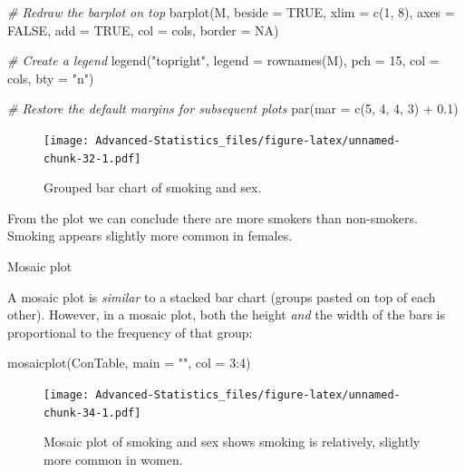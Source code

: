 \documentclass[
]{book}
\newenvironment{Shaded}{\begin{snugshade}}{\end{snugshade}}
\newcommand{\AttributeTok}[1]{\textcolor[rgb]{0.77,0.63,0.00}{#1}}
\newcommand{\CommentTok}[1]{\textcolor[rgb]{0.56,0.35,0.01}{\textit{#1}}}
\newcommand{\ConstantTok}[1]{\textcolor[rgb]{0.00,0.00,0.00}{#1}}
\newcommand{\DecValTok}[1]{\textcolor[rgb]{0.00,0.00,0.81}{#1}}
\newcommand{\FloatTok}[1]{\textcolor[rgb]{0.00,0.00,0.81}{#1}}
\newcommand{\FunctionTok}[1]{\textcolor[rgb]{0.00,0.00,0.00}{#1}}
\newcommand{\NormalTok}[1]{#1}
\newcommand{\SpecialCharTok}[1]{\textcolor[rgb]{0.00,0.00,0.00}{#1}}
\newcommand{\StringTok}[1]{\textcolor[rgb]{0.31,0.60,0.02}{#1}}
\begin{document}
\begin{Shaded}
\begin{Highlighting}[]
\CommentTok{\# Redraw the barplot on top}
\FunctionTok{barplot}\NormalTok{(M, }\AttributeTok{beside =} \ConstantTok{TRUE}\NormalTok{, }\AttributeTok{xlim =} \FunctionTok{c}\NormalTok{(}\DecValTok{1}\NormalTok{, }\DecValTok{8}\NormalTok{), }\AttributeTok{axes =} \ConstantTok{FALSE}\NormalTok{, }\AttributeTok{add =} \ConstantTok{TRUE}\NormalTok{,}
        \AttributeTok{col =}\NormalTok{ cols, }\AttributeTok{border =} \ConstantTok{NA}\NormalTok{)}

\CommentTok{\# Create a legend}
\FunctionTok{legend}\NormalTok{(}\StringTok{"topright"}\NormalTok{, }\AttributeTok{legend =} \FunctionTok{rownames}\NormalTok{(M), }\AttributeTok{pch =} \DecValTok{15}\NormalTok{, }\AttributeTok{col =}\NormalTok{ cols, }\AttributeTok{bty =} \StringTok{"n"}\NormalTok{)}

\CommentTok{\# Restore the default margins for subsequent plots}
\FunctionTok{par}\NormalTok{(}\AttributeTok{mar =} \FunctionTok{c}\NormalTok{(}\DecValTok{5}\NormalTok{, }\DecValTok{4}\NormalTok{, }\DecValTok{4}\NormalTok{, }\DecValTok{3}\NormalTok{) }\SpecialCharTok{+} \FloatTok{0.1}\NormalTok{)}
\end{Highlighting}
\end{Shaded}

\begin{figure}
\centering
\texttt{[image: Advanced-Statistics\_files/figure-latex/unnamed-chunk-32-1.pdf]}
\caption{\label{fig:unnamed-chunk-32}Grouped bar chart of smoking and sex.}
\end{figure}

From the plot we can conclude there are more smokers than non-smokers. Smoking appears slightly more common in females.

Mosaic plot

A mosaic plot is \emph{similar} to a stacked bar chart (groups pasted on top of each other). However, in a mosaic plot, both the height \emph{and} the width of the bars is proportional to the frequency of that group:

\begin{Shaded}
\begin{Highlighting}[]
\FunctionTok{mosaicplot}\NormalTok{(ConTable, }\AttributeTok{main =} \StringTok{""}\NormalTok{, }\AttributeTok{col =} \DecValTok{3}\SpecialCharTok{:}\DecValTok{4}\NormalTok{)}
\end{Highlighting}
\end{Shaded}

\begin{figure}
\centering
\texttt{[image: Advanced-Statistics\_files/figure-latex/unnamed-chunk-34-1.pdf]}
\caption{\label{fig:unnamed-chunk-34}Mosaic plot of smoking and sex shows smoking is relatively, slightly more common in women.}
\end{figure}
\end{document}
